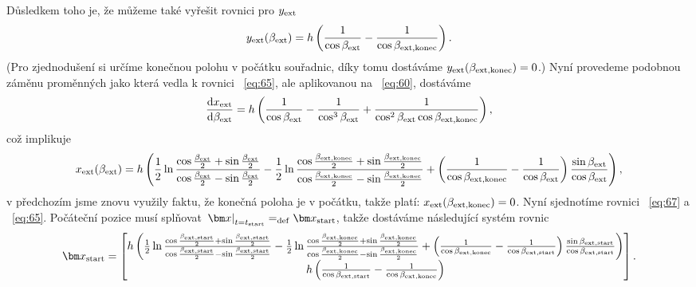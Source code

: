 \documentclass[reqno, a4paper]{amsart}
\begin{document}
Důsledkem toho je, že můžeme také vyřešit rovnici pro $y_{\mathrm{ext}}$
\begin{equation}
  \label{eq:65}
  y_{\mathrm{ext}}(\beta_{\mathrm{ext}})
  =
  h
  \left(
    \frac{1}{\cos \beta_{\mathrm{ext}}}
    -
    \frac{1}{\cos \beta_{\mathrm{ext}, \mathrm{konec}}}
  \right)
  .
\end{equation}
(Pro zjednodušení si určíme konečnou polohu v počátku souřadnic, díky tomu dostáváme $y_{\mathrm{ext}}(\beta_{\mathrm{ext}, \mathrm{konec}}) = 0$.)
Nyní provedeme podobnou záměnu proměnných jako která vedla k rovnici ~\eqref{eq:65}, ale aplikovanou na ~\eqref{eq:60}, dostáváme
\begin{equation}
  \label{eq:66}
  \frac{\mathrm{d} {x_{\mathrm{ext}}}}{\mathrm{d} {\beta_{\mathrm{ext}}}}
  =
  h
  \left(
    \frac{1}{\cos \beta_{\mathrm{ext}}}
    -
    \frac{1}{\cos^3 \beta_{\mathrm{ext}}}
    +
    \frac{1}{\cos^2 \beta_{\mathrm{ext}} \cos \beta_{\mathrm{ext}, \mathrm{konec}}}
  \right)
  ,
\end{equation}
což implikuje
\begin{equation}
  \label{eq:67}
  x_{\mathrm{ext}}(\beta_{\mathrm{ext}})
  =
  h
  \left(
    \frac{1}{2}
    \ln
    \frac{\cos \frac{\beta_{\mathrm{ext}}}{2} + \sin \frac{\beta_{\mathrm{ext}}}{2}}{\cos \frac{\beta_{\mathrm{ext}}}{2} - \sin \frac{\beta_{\mathrm{ext}}}{2}}
    -
    \frac{1}{2}
    \ln
    \frac{\cos \frac{\beta_{\mathrm{ext}, \mathrm{konec}}}{2} + \sin \frac{\beta_{\mathrm{ext}, \mathrm{konec}}}{2}}{\cos \frac{\beta_{\mathrm{ext}, \mathrm{konec}}}{2} - \sin \frac{\beta_{\mathrm{ext}, \mathrm{konec}}}{2}}
    +
    \left(
      \frac{1}{\cos \beta_{\mathrm{ext}, \mathrm{konec}}}
      -
      \frac{1}{\cos \beta_{\mathrm{ext}}}
    \right)
    \frac{\sin \beta_{\mathrm{ext}}}{\cos \beta_{\mathrm{ext}}}
  \right)
  ,
\end{equation}
v předchozím jsme znovu využily faktu, že konečná poloha je v počátku, takže platí: $x_{\mathrm{ext}}(\beta_{\mathrm{ext}, \mathrm{konec}}) = 0$. Nyní sjednotíme rovnici ~\eqref{eq:67} a ~\eqref{eq:65}. Počáteční pozice musí splňovat $ \left. \vec{x} \right|_{t=t_\navstart} = _{\bydefinition} \vec{x}_{\navstart}$, takže dostáváme následující systém rovnic
\begin{equation}
  \label{eq:68}
  \vec{x}_{\navstart}
  =
  \begin{bmatrix}
  h
  \left(
    \frac{1}{2}
    \ln
    \frac{\cos \frac{\beta_{\navext, \navstart}}{2} + \sin \frac{\beta_{\navext, \navstart}}{2}}{\cos \frac{\beta_{\navext, \navstart}}{2} - \sin \frac{\beta_{\navext, \navstart}}{2}}
    -
    \frac{1}{2}
    \ln
    \frac{\cos \frac{\beta_{\navext, \navend}}{2} + \sin \frac{\beta_{\navext, \navend}}{2}}{\cos \frac{\beta_{\navext, \navend}}{2} - \sin \frac{\beta_{\navext, \navend}}{2}}
    +
    \left(
      \frac{1}{\cos \beta_{\navext, \navend}}
      -
      \frac{1}{\cos \beta_{\navext, \navstart}}
    \right)
    \frac{\sin \beta_{\navext, \navstart}}{\cos \beta_{\navext, \navstart}}
  \right)
\\
    h
  \left(
    \frac{1}{\cos \beta_{\navext, \navstart}}
    -
    \frac{1}{\cos \beta_{\navext, \navend}}
  \right)
\end{bmatrix}
.
\end{equation}
\end{document}
